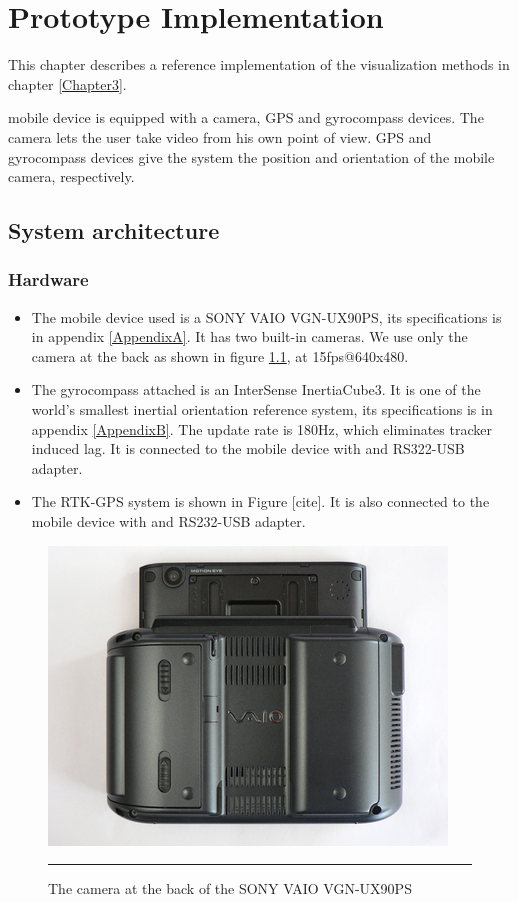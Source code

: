 \chapter{Prototype Implementation}
\label{Chapter4}

This chapter describes a reference implementation of the visualization methods in chapter \ref{Chapter3}.

mobile device is equipped with a camera, GPS and gyrocompass devices. The camera lets the user take video from his own point of view. GPS and gyrocompass devices give the system the position and orientation of the mobile camera, respectively.


\section{System architecture}

\subsection{Hardware}

\begin{itemize}
	\item The mobile device used is a SONY VAIO VGN-UX90PS, its specifications is in appendix \ref{AppendixA}. It has two built-in cameras. We use only the camera at the back as shown in figure \ref{fig:VAIO_Back}, at 15fps@640x480.
	\item The gyrocompass attached is an InterSense InertiaCube3. It is one of the world's smallest inertial orientation reference system, its specifications is in appendix \ref{AppendixB}. The update rate is 180Hz, which eliminates tracker induced lag. It is connected to the mobile device with and RS322-USB adapter.
	\item The RTK-GPS system is shown in Figure [cite]. It is also connected to the mobile device with and RS232-USB adapter.
\end{itemize}

\begin{figure}[htbp]
  \centering
    \includegraphics{./Primitives/vaio_back.jpg}
    \rule{35em}{0.5pt}
  \caption[The camera at the back of the SONY VAIO VGN-UX90PS]{The camera at the back of the SONY VAIO VGN-UX90PS}
  \label{fig:VAIO_Back}
\end{figure}


